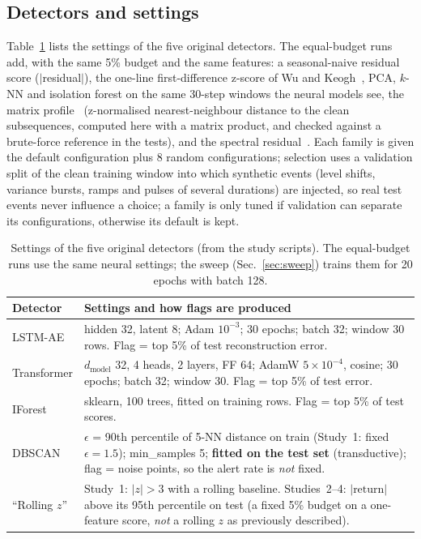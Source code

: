\documentclass[10pt,twocolumn]{article}
\begin{document}
\subsection{Detectors and settings}
Table~\ref{tab:det} lists the settings of the five original detectors. The equal-budget runs add, with the same 5\% budget and the same features: a seasonal-naive residual score ($|$residual$|$), the one-line first-difference z-score of Wu and Keogh~\cite{wu2023flawed}, PCA, $k$-NN and isolation forest on the same 30-step windows the neural models see, the matrix profile~\cite{yeh2016matrix} (z-normalised nearest-neighbour distance to the clean subsequences, computed here with a matrix product, and checked against a brute-force reference in the tests), and the spectral residual~\cite{ren2019spectral}. Each family is given the default configuration plus 8 random configurations; selection uses a validation split of the clean training window into which synthetic events (level shifts, variance bursts, ramps and pulses of several durations) are injected, so real test events never influence a choice; a family is only tuned if validation can separate its configurations, otherwise its default is kept.

\begin{table}[t]
\centering\scriptsize\setlength{\tabcolsep}{3pt}
\begin{tabular}{p{}p{}}
\toprule
Detector & Settings and how flags are produced \\
\midrule
LSTM-AE & hidden 32, latent 8; Adam $10^{-3}$; 30 epochs; batch 32; window 30 rows. Flag = top 5\% of test reconstruction error. \\
Transformer & $d_\text{model}$ 32, 4 heads, 2 layers, FF 64; AdamW $5\!\times\!10^{-4}$, cosine; 30 epochs; batch 32; window 30. Flag = top 5\% of test error. \\
IForest & sklearn, 100 trees, fitted on training rows. Flag = top 5\% of test scores. \\
DBSCAN & $\epsilon$ = 90th percentile of 5-NN distance on train (Study~1: fixed $\epsilon{=}1.5$); min\_samples 5; \textbf{fitted on the test set} (transductive); flag = noise points, so the alert rate is \emph{not} fixed. \\
``Rolling $z$'' & Study~1: $|z|>3$ with a rolling baseline. Studies~2--4: $|\text{return}|$ above its 95th percentile on test (a fixed 5\% budget on a one-feature score, \emph{not} a rolling $z$ as previously described). \\
\bottomrule
\end{tabular}
\caption{Settings of the five original detectors (from the study scripts). The equal-budget runs use the same neural settings; the sweep (Sec.~\ref{sec:sweep}) trains them for 20 epochs with batch 128.}\label{tab:det}
\end{table}
\end{document}
